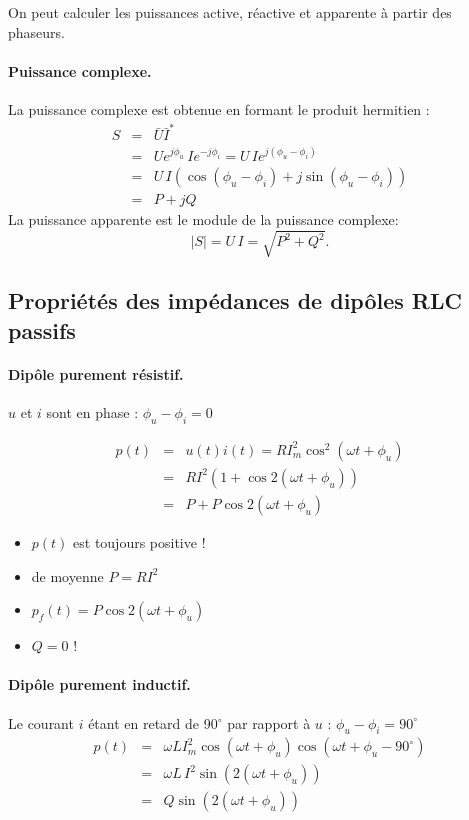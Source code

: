 On peut calculer les puissances active, réactive et apparente à partir des phaseurs. 
		
\paragraph{Puissance complexe.}
La puissance complexe est obtenue en formant le produit hermitien :
\begin{eqnarray*}
	S&=&\bar{U}\bar{I}^*\\
	& = & Ue^{j\phi_u}\,Ie^{-j\phi_i}= U\, Ie^{j(\phi_u-\phi_i)}\\
	& = & U\,I \left(\cos(\phi_u-\phi_i)+j\sin(\phi_u-\phi_i)\right)\\
	& = & P + j Q			
\end{eqnarray*}
La puissance apparente est le module de la puissance complexe:
$$|S|=U\,I=\sqrt{P^2+Q^2}.$$

\subsection{Propriétés des impédances de dipôles RLC passifs}

\paragraph{Dipôle purement résistif.}

$u$ et $i$ sont en phase : $\phi_u-\phi_i=0$

\begin{eqnarray*}
	p(t)& = &u(t)i(t)=RI_m^2\cos^2(\omega t + \phi_u)\\
	& =& RI^2(1+\cos 2(\omega t + \phi_u))\\
	& = & P + P \cos 2(\omega t+ \phi_u)
\end{eqnarray*}

\begin{itemize}
\item $p(t)$ est toujours positive !
\item de moyenne $P=RI^2$
\item $p_f(t)= P \cos 2(\omega t+ \phi_u)$
\item $Q=0$ !
\end{itemize}


\paragraph{Dipôle purement inductif.}
Le courant $i$ étant en retard de 90$^{\circ}$ par rapport à $u$ :
$\phi_u-\phi_i=90^{\circ}$
\begin{eqnarray*}
	p(t)& =& \omega L I_m^2 \cos(\omega t+\phi_u)\cos (\omega
	t+\phi_u - 90^{\circ})\\
	& = & \omega L\, I^2 \sin (2(\omega t + \phi_u))\\
	& = & Q \sin (2(\omega t + \phi_u))
\end{eqnarray*}

